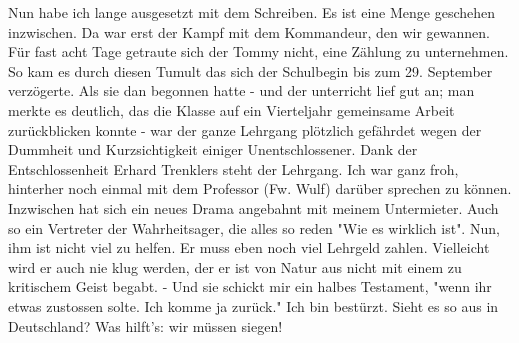 \def\day{10. Oktober 1943}
\mktitle

Nun habe ich lange ausgesetzt mit dem Schreiben.
Es ist eine Menge geschehen inzwischen.
Da war erst der Kampf mit dem Kommandeur, den wir gewannen.
F\"{u}r fast acht Tage getraute sich der Tommy nicht, eine Z\"{a}hlung zu unternehmen.
So kam es durch diesen Tumult das sich der Schulbegin bis zum 29. September verz\"{o}gerte.
Als sie dan begonnen hatte - und der unterricht lief gut an; man merkte es deutlich, das die Klasse auf ein Vierteljahr gemeinsame Arbeit zur\"{u}ckblicken konnte - war der ganze Lehrgang pl\"{o}tzlich gef\"{a}hrdet wegen der Dummheit und Kurzsichtigkeit einiger Unentschlossener.
Dank der Entschlossenheit Erhard Trenklers steht der Lehrgang.
Ich war ganz froh, hinterher noch einmal mit dem Professor (Fw. Wulf) dar\"{u}ber sprechen zu k\"{o}nnen.
Inzwischen hat sich ein neues Drama angebahnt mit meinem Untermieter.
Auch so ein Vertreter der Wahrheitsager, die alles so reden "Wie es wirklich ist".
Nun, ihm ist nicht viel zu helfen.
Er muss eben noch viel Lehrgeld zahlen.
Vielleicht wird er auch nie klug werden, der er ist von Natur aus nicht mit einem zu kritischem Geist begabt.
- Und sie schickt mir ein halbes Testament, "wenn ihr etwas zustossen solte. Ich komme ja zur\"{u}ck."
Ich bin best\"{u}rzt.
Sieht es so aus in Deutschland?
Was hilft's: wir m\"{u}ssen siegen!

\clearpage
